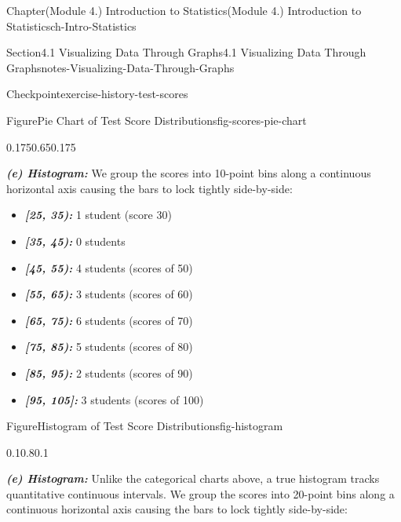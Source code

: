 \documentclass[oneside,10pt,]{book}
\newcommand{\ptxlistdisc}{\raisebox{0.3ex}{\textbullet}}
\newcommand{\alert}[1]{\textbf{\textit{#1}}}
\begin{document}
\begin{chapterptx}{Chapter}{(Module 4.) Introduction to Statistics}{}{(Module 4.) Introduction to Statistics}{}{}{ch-Intro-Statistics}
\begin{sectionptx}{Section}{4.1 Visualizing Data Through Graphs}{}{4.1 Visualizing Data Through Graphs}{}{}{notes-Visualizing-Data-Through-Graphs}
\begin{inlineexercise}{Checkpoint}{}{exercise-history-test-scores}
\begin{figureptx}{Figure}{Pie Chart of Test Score Distributions}{fig-scores-pie-chart}{}
\begin{image}{0.175}{0.65}{0.175}{}
{%
}%
\end{image}%
\tcblower
\end{figureptx}%
\alert{(e) Histogram:} We group the scores into 10-point bins along a continuous horizontal axis causing the bars to lock tightly side-by-side:%
\par
%
\begin{itemize}[label=\ptxlistdisc]
\item{}\alert{[25, 35):} 1 student (score 30)%
\item{}\alert{[35, 45):} 0 students%
\item{}\alert{[45, 55):} 4 students (scores of 50)%
\item{}\alert{[55, 65):} 3 students (scores of 60)%
\item{}\alert{[65, 75):} 6 students (scores of 70)%
\item{}\alert{[75, 85):} 5 students (scores of 80)%
\item{}\alert{[85, 95):} 2 students (scores of 90)%
\item{}\alert{[95, 105]:} 3 students (scores of 100)%
\end{itemize}
%
\begin{figureptx}{Figure}{Histogram of Test Score Distributions}{fig-histogram}{}%
\begin{image}{0.1}{0.8}{0.1}{}%
%
\end{image}%
\tcblower
\end{figureptx}%
\alert{(e) Histogram:} Unlike the categorical charts above, a true histogram tracks quantitative continuous intervals. We group the scores into 20-point bins along a continuous horizontal axis causing the bars to lock tightly side-by-side:%

\end{inlineexercise}
\end{sectionptx}
\end{chapterptx}
\end{document}
